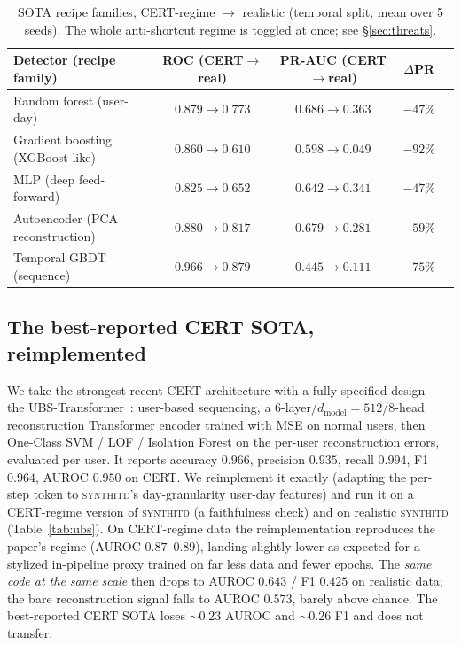 \documentclass[11pt]{article}
\newcommand{\sys}{\textsc{synthitd}}
\begin{document}
\begin{table}[t]
\centering
\caption{SOTA recipe families, CERT-regime $\rightarrow$ realistic (temporal split,
mean over 5 seeds). The whole anti-shortcut regime is toggled at once; see
\S\ref{sec:threats}.}
\label{tab:ablation}
\small
\begin{tabular}{lcccc}
\toprule
Detector (recipe family) & ROC (CERT$\to$real) & PR-AUC (CERT$\to$real) & $\Delta$PR \\
\midrule
Random forest (user-day)        & $0.879\to0.773$ & $0.686\to0.363$ & $-47\%$ \\
Gradient boosting (XGBoost-like)& $0.860\to0.610$ & $0.598\to0.049$ & $-92\%$ \\
MLP (deep feed-forward)         & $0.825\to0.652$ & $0.642\to0.341$ & $-47\%$ \\
Autoencoder (PCA reconstruction)& $0.880\to0.817$ & $0.679\to0.281$ & $-59\%$ \\
Temporal GBDT (sequence)        & $0.966\to0.879$ & $0.445\to0.111$ & $-75\%$ \\
\bottomrule
\end{tabular}
\end{table}

\subsection{The best-reported CERT SOTA, reimplemented}
We take the strongest recent CERT architecture with a fully specified design---the
UBS-Transformer~\citep{ubstransformer2025}: user-based sequencing, a
6-layer/$d_{\text{model}}{=}512$/8-head reconstruction Transformer encoder trained with
MSE on normal users, then One-Class SVM / LOF / Isolation Forest on the per-user
reconstruction errors, evaluated per user. It reports accuracy $0.966$, precision
$0.935$, recall $0.994$, F1 $0.964$, AUROC $0.950$ on CERT. We reimplement it exactly
(adapting the per-step token to \sys{}'s day-granularity user-day features) and run it
on a CERT-regime version of \sys{} (a faithfulness check) and on realistic \sys{}
(Table~\ref{tab:ubs}). On CERT-regime data the reimplementation reproduces the paper's
regime (AUROC $0.87$--$0.89$), landing slightly lower as expected for a stylized
in-pipeline proxy trained on far less data and fewer epochs. The \emph{same code at the
same scale} then drops to AUROC $0.643$ / F1 $0.425$ on realistic data; the bare
reconstruction signal falls to AUROC $0.573$, barely above chance. The best-reported
CERT SOTA loses $\sim$0.23 AUROC and $\sim$0.26 F1 and does not transfer.
\end{document}
